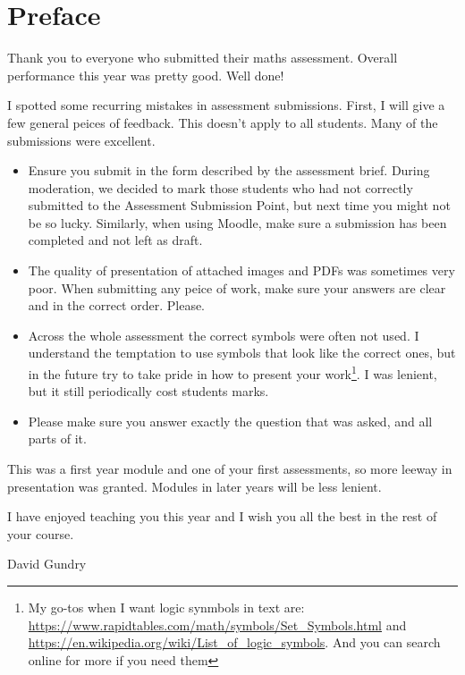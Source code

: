 \documentclass{article}
\begin{document}
\section*{Preface} 

Thank you to everyone who submitted their maths assessment. Overall performance this year was pretty good. Well done!

I spotted some recurring mistakes in assessment submissions. First, I will give a few general peices of feedback. This doesn't apply to all students. Many of the submissions were excellent.

\begin{itemize}
\item Ensure you submit in the form described by the assessment brief. During moderation, we decided to mark those students who had not correctly submitted to the Assessment Submission Point, but next time you might not be so lucky. Similarly, when using Moodle, make sure a submission has been completed and not left as draft.

\item The quality of presentation of attached images and PDFs was sometimes very poor. When submitting any peice of work, make sure your answers are clear and in the correct order. Please.

\item Across the whole assessment the correct symbols were often not used. I understand the temptation to use symbols that look like the correct ones, but in the future try to take pride in how to present your work\footnote{My go-tos when I want logic synmbols in text are: \url{https://www.rapidtables.com/math/symbols/Set_Symbols.html} and \url{https://en.wikipedia.org/wiki/List_of_logic_symbols}. And you can search online for more if you need them}. I was lenient, but it still periodically cost students marks. 

\item Please make sure you answer exactly the question that was asked, and all parts of it.
\end{itemize}

This was a first year module and one of your first assessments, so more leeway in presentation was granted. Modules in later years will be less lenient.

I have enjoyed teaching you this year and I wish you all the best in the rest of your course.

\begin{flushright}
    David Gundry
\end{flushright}
\end{document}
